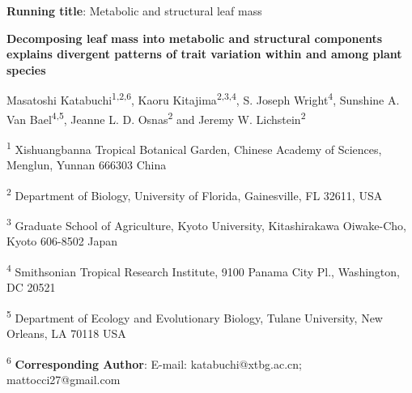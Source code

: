 \documentclass[
  12pt,
  letterpaper,
  DIV=11,
  numbers=noendperiod]{scrartcl}
\author{}
\date{}
\begin{document}
\ifdefined\Shaded\renewenvironment{Shaded}{\begin{tcolorbox}[interior hidden, borderline west={3pt}{0pt}{shadecolor}, breakable, frame hidden, enhanced, sharp corners, boxrule=0pt]}{\end{tcolorbox}}\fi

\textbf{Running title}: Metabolic and structural leaf mass

\textbf{Decomposing leaf mass into metabolic and structural components
explains divergent patterns of trait variation within and among plant
species}

Masatoshi Katabuchi\textsuperscript{1,2,6}, Kaoru
Kitajima\textsuperscript{2,3,4}, S. Joseph Wright\textsuperscript{4},
Sunshine A. Van Bael\textsuperscript{4,5}, Jeanne L. D.
Osnas\textsuperscript{2} and Jeremy W. Lichstein\textsuperscript{2}

\textsuperscript{1} Xishuangbanna Tropical Botanical Garden, Chinese
Academy of Sciences, Menglun, Yunnan 666303 China

\textsuperscript{2} Department of Biology, University of Florida,
Gainesville, FL 32611, USA

\textsuperscript{3} Graduate School of Agriculture, Kyoto University,
Kitashirakawa Oiwake-Cho, Kyoto 606-8502 Japan

\textsuperscript{4} Smithsonian Tropical Research Institute, 9100 Panama
City Pl., Washington, DC 20521

\textsuperscript{5} Department of Ecology and Evolutionary Biology,
Tulane University, New Orleans, LA 70118 USA

\textsuperscript{6} \textbf{Corresponding Author}: E-mail:
katabuchi@xtbg.ac.cn; mattocci27@gmail.com
\end{document}
